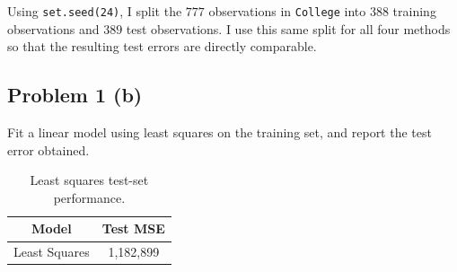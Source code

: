 \documentclass[
  10pt,
]{extarticle}
\newenvironment{Shaded}{\begin{snugshade}}{\end{snugshade}}
\newcommand{\AttributeTok}[1]{\textcolor[rgb]{0.13,0.29,0.53}{#1}}
\newcommand{\CommentTok}[1]{\textcolor[rgb]{0.56,0.35,0.01}{\textit{#1}}}
\newcommand{\FunctionTok}[1]{\textcolor[rgb]{0.13,0.29,0.53}{\textbf{#1}}}
\newcommand{\NormalTok}[1]{#1}
\newcommand{\OtherTok}[1]{\textcolor[rgb]{0.56,0.35,0.01}{#1}}
\newcommand{\SpecialCharTok}[1]{\textcolor[rgb]{0.81,0.36,0.00}{\textbf{#1}}}
\newcommand{\StringTok}[1]{\textcolor[rgb]{0.31,0.60,0.02}{#1}}
\begin{document}
Using \texttt{set.seed(24)}, I split the \(777\) observations in \texttt{College} into \(388\) training observations and \(389\) test observations. I use this same split for all four methods so that the resulting test errors are directly comparable.

\newpage

\subsection{Problem 1 (b)}\label{problem-1-b}

\begin{problem}[Problem 1 (b)]
Fit a linear model using least squares on the training set, and report the test error obtained.
\end{problem}

\begin{Shaded}
\end{Shaded}

\begin{table}[H]
\centering
\caption{\label{tab:unnamed-chunk-2}Least squares test-set performance.}
\centering
\begin{tabular}[t]{cc}
\toprule
Model & Test MSE\\
\midrule
Least Squares & 1,182,899\\
\bottomrule
\end{tabular}
\end{table}
\end{document}
